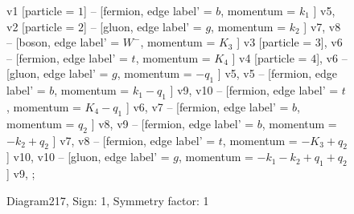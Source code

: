 \documentclass{revtex4}
\begin{document}
\begin{figure}[!htb]
\begin{center}
{    %
v1 [particle = \(1\)] -- [fermion, edge label' = \(b\), momentum = \(k_{1}\) ] v5, 
v2 [particle = \(2\)] -- [gluon, edge label' = \(g\), momentum = \(k_{2}\) ] v7, 
v8 -- [boson, edge label' = \(W^{-}\), momentum = \(K_{3}\) ] v3 [particle = \(3\)], 
v6 -- [fermion, edge label' = \(t\), momentum = \(K_{4}\) ] v4 [particle = \(4\)], 
v6 -- [gluon, edge label' = \(g\), momentum = \(-q_{1}\) ] v5, 
v5 -- [fermion, edge label' = \(b\), momentum = \(k_{1} - q_{1}\) ] v9, 
v10 -- [fermion, edge label' = \(t\), momentum = \(K_{4} - q_{1}\) ] v6, 
v7 -- [fermion, edge label' = \(b\), momentum = \(q_{2}\) ] v8, 
v9 -- [fermion, edge label' = \(b\), momentum = \(-k_{2} + q_{2}\) ] v7, 
v8 -- [fermion, edge label' = \(t\), momentum = \(-K_{3} + q_{2}\) ] v10, 
v10 -- [gluon, edge label' = \(g\), momentum = \(-k_{1} - k_{2} + q_{1} + q_{2}\) ] v9, 
};
\end{center}
\caption{Diagram217, Sign: 1, Symmetry factor: 1}
\end{figure}
\newpage
\end{document}
